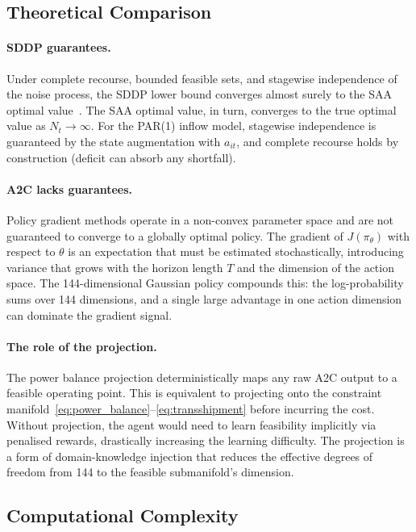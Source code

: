 \documentclass[11pt,letterpaper]{article}
\begin{document}
\subsection{Theoretical Comparison}

\paragraph{SDDP guarantees.}
Under complete recourse, bounded feasible sets, and stagewise independence of
the noise process, the SDDP lower bound converges almost surely to the SAA
optimal value~\citep{philpott2008}.  The SAA optimal value, in turn, converges
to the true optimal value as $N_t \to \infty$.  For the PAR(1) inflow model,
stagewise independence is guaranteed by the state augmentation with $a_{it}$,
and complete recourse holds by construction (deficit can absorb any shortfall).

\paragraph{A2C lacks guarantees.}
Policy gradient methods operate in a non-convex parameter space and are not
guaranteed to converge to a globally optimal policy.  The gradient of $J(\pi_\theta)$
with respect to $\theta$ is an expectation that must be estimated stochastically,
introducing variance that grows with the horizon length $T$ and the dimension of
the action space.  The 144-dimensional Gaussian policy compounds this: the
log-probability sums over 144 dimensions, and a single large advantage in one
action dimension can dominate the gradient signal.

\paragraph{The role of the projection.}
The power balance projection deterministically maps any raw A2C output to a
feasible operating point.  This is equivalent to projecting onto the constraint
manifold~\eqref{eq:power_balance}--\eqref{eq:transshipment} before incurring the
cost.  Without projection, the agent would need to learn feasibility implicitly
via penalised rewards, drastically increasing the learning difficulty.
The projection is a form of domain-knowledge injection that reduces the effective
degrees of freedom from 144 to the feasible submanifold's dimension.

\subsection{Computational Complexity}
\end{document}
